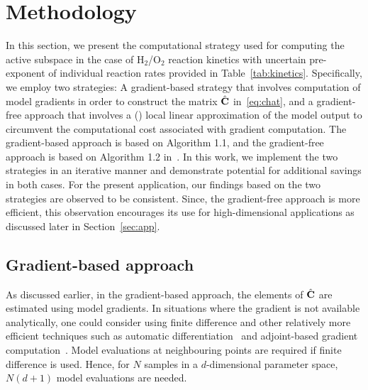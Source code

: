 \section{Methodology}
\label{sec:method}

In this section, we present the computational strategy used for computing the
active subspace in the case of H$_2$/O$_2$ reaction kinetics with uncertain
pre-exponent of individual reaction rates provided in Table~\ref{tab:kinetics}.
Specifically, we employ two strategies: 
A gradient-based strategy that involves computation of model
gradients in order to construct the matrix $\hat{\mathbf{{C}}}$
in~\eqref{eq:chat}, and a gradient-free approach 
that involves a () local linear approximation of
the model output to circumvent the computational cost associated with gradient
computation. The gradient-based approach is based on Algorithm
1.1, and the gradient-free approach is based on Algorithm 1.2
in~\cite{Constantine:2015}. In this work, we implement the two
strategies in an iterative manner and demonstrate potential for
additional savings in both cases.  For the present application,
our findings based on the two strategies are observed to be consistent.  
Since,
the gradient-free approach is more efficient, this observation
encourages its use for high-dimensional applications as discussed later in
Section~\ref{sec:app}. 

\subsection{Gradient-based approach}
\label{sub:grad}

As discussed earlier, in the gradient-based approach, the elements of
$\hat{\mathbf{{C}}}$ are estimated using model gradients.  In situations where the
gradient is not available analytically, one could consider using finite
difference and other relatively more efficient techniques such as automatic
differentiation~\cite{Kiparissides:2009} and adjoint-based gradient
computation~\cite{Jameson:1988,Gunzburger:2003,Borzi:2011,Alexanderian:2017}.
Model evaluations at neighbouring points are required if finite difference is
used. Hence, for $N$ samples in a $d$-dimensional parameter space, $N(d+1)$
model evaluations are needed. 

